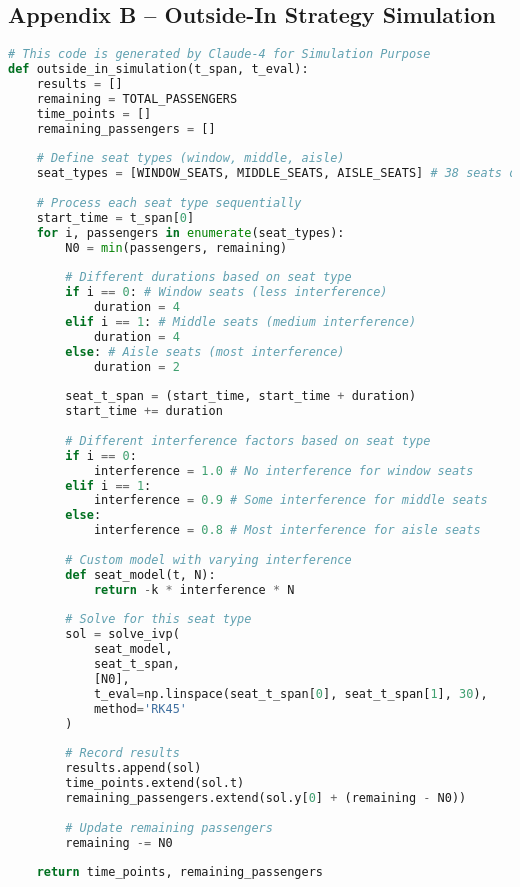 \documentclass[12pt]{article}
\begin{document}
\subsection{Appendix B – Outside-In Strategy Simulation}

\begin{lstlisting}[language=Python, caption=Outside-In Boarding Strategy Simulation, label=lst:outside_in]
# This code is generated by Claude-4 for Simulation Purpose
def outside_in_simulation(t_span, t_eval):
    results = []
    remaining = TOTAL_PASSENGERS
    time_points = []
    remaining_passengers = []
    
    # Define seat types (window, middle, aisle)
    seat_types = [WINDOW_SEATS, MIDDLE_SEATS, AISLE_SEATS] # 38 seats of each type
    
    # Process each seat type sequentially
    start_time = t_span[0]
    for i, passengers in enumerate(seat_types):
        N0 = min(passengers, remaining)
        
        # Different durations based on seat type
        if i == 0: # Window seats (less interference)
            duration = 4
        elif i == 1: # Middle seats (medium interference)
            duration = 4
        else: # Aisle seats (most interference)
            duration = 2
            
        seat_t_span = (start_time, start_time + duration)
        start_time += duration
        
        # Different interference factors based on seat type
        if i == 0:
            interference = 1.0 # No interference for window seats
        elif i == 1:
            interference = 0.9 # Some interference for middle seats
        else:
            interference = 0.8 # Most interference for aisle seats
            
        # Custom model with varying interference
        def seat_model(t, N):
            return -k * interference * N
            
        # Solve for this seat type
        sol = solve_ivp(
            seat_model,
            seat_t_span,
            [N0],
            t_eval=np.linspace(seat_t_span[0], seat_t_span[1], 30),
            method='RK45'
        )
        
        # Record results
        results.append(sol)
        time_points.extend(sol.t)
        remaining_passengers.extend(sol.y[0] + (remaining - N0))
        
        # Update remaining passengers
        remaining -= N0
        
    return time_points, remaining_passengers
\end{lstlisting}
\end{document}
